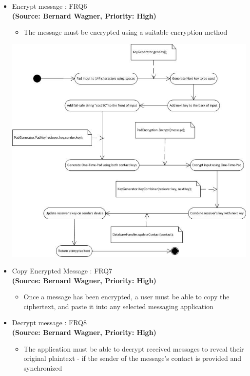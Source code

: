 \begin{itemize}
\item{Encrypt message : FRQ6}\\
\textbf{(Source: Bernard Wagner, Priority: High)}
\begin{itemize}
\item The message must be encrypted using a suitable encryption method
\end{itemize}
 \includegraphics[width=13cm]{diagrams/StateDiagrams/EncryptMessageStateDiagram.png}
\item{Copy Encrypted Message : FRQ7}\\
\textbf{(Source: Bernard Wagner, Priority: High)}
\begin{itemize}
\item Once a message has been encrypted, a user must be able to copy the ciphertext, and paste it into any selected messaging application
\end{itemize}
\item{Decrypt message : FRQ8}\\
\textbf{(Source: Bernard Wagner, Priority: High)}
\begin{itemize}
\item The application must be able to decrypt received messages to reveal their original plaintext - if the sender of the message's contact is provided and synchronized
\end{itemize}

\end{itemize}
